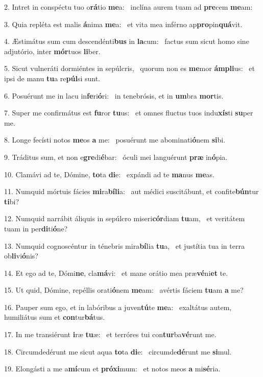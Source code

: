 2. Intret in conspéctu tuo o\textbf{rá}tio \textbf{me}a: \ast\  inclína aurem tuam ad \textbf{pre}cem \textbf{me}am:\

3. Quia repléta est malis \textbf{á}nima \textbf{me}a: \ast\  et vita mea inférno ap\textbf{pro}pin\textbf{quá}vit.\

4. Æstimátus sum cum descendénti\textbf{bus} in \textbf{la}cum: \ast\  factus sum sicut homo sine adjutório, inter \textbf{mór}tuos \textbf{li}ber.\

5. Sicut vulneráti dormiéntes in sepúlcris, \dag\  quorum non es \textbf{me}mor \textbf{ám}\textbf{pli}us: \ast\  et ipsi de manu \textbf{tu}a re\textbf{púl}si sunt.\

6. Posuérunt me in lacu in\textbf{fe}ri\textbf{ó}ri: \ast\  in tenebrósis, et in \textbf{um}bra \textbf{mor}tis.\

7. Super me confirmátus est \textbf{fu}ror \textbf{tu}us: \ast\  et omnes fluctus tuos indu\textbf{xís}ti \textbf{su}per me.\

8. Longe fecísti notos \textbf{me}os \textbf{a} me: \ast\  posuérunt me abominati\textbf{ó}nem \textbf{si}bi.\

9. Tráditus sum, et non e\textbf{gre}di\textbf{é}bar: \ast\  óculi mei languérunt \textbf{præ} in\textbf{ó}pia.\

10. Clamávi ad te, Dómine, \textbf{to}ta \textbf{di}e: \ast\  expándi ad te \textbf{ma}nus \textbf{me}as.\

11. Numquid mórtuis fácies \textbf{mi}ra\textbf{bí}\textbf{li}a: \ast\  aut médici suscitábunt, et confite\textbf{bún}tur \textbf{ti}bi?\

12. Numquid narrábit áliquis in sepúlcro miseri\textbf{cór}diam \textbf{tu}am, \ast\  et veritátem tuam in per\textbf{di}ti\textbf{ó}ne?\

13. Numquid cognoscéntur in ténebris mira\textbf{bí}lia \textbf{tu}a, \ast\  et justítia tua in terra ob\textbf{li}vi\textbf{ó}nis?\

14. Et ego ad te, Dómi\textbf{ne}, cla\textbf{má}vi: \ast\  et mane orátio mea præ\textbf{vé}ni\textbf{et} te.\

15. Ut quid, Dómine, repéllis orati\textbf{ó}nem \textbf{me}am: \ast\  avértis fáciem \textbf{tu}am \textbf{a} me?\

16. Pauper sum ego, et in labóribus a juven\textbf{tú}te \textbf{me}a: \ast\  exaltátus autem, humiliátus sum et \textbf{con}tur\textbf{bá}tus.\

17. In me transiérunt \textbf{i}ræ \textbf{tu}æ: \ast\  et terróres tui con\textbf{tur}ba\textbf{vé}runt me.\

18. Circumdedérunt me sicut aqua \textbf{to}ta \textbf{di}e: \ast\  circumde\textbf{dé}runt me \textbf{si}mul.\

19. Elongásti a me a\textbf{mí}cum et \textbf{pró}\textbf{xi}mum: \ast\  et notos meos \textbf{a} mi\textbf{sé}ria.\


